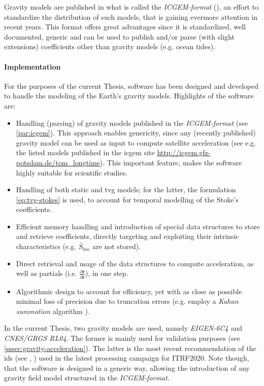 Gravity models are published in what is called the \emph{ICGEM-format} 
(\cite{ICGEMFormat}), an effort to standardize the distribution of such models, 
that is gaining evermore attention in recent years. This format offers great 
advantages since it is standardized, well documented, generic and can be used to 
publish and/or parse (with slight extensions) coefficients other than gravity 
models (e.g. ocean tides).

\paragraph{Implementation}\label{par:implementation}
For the purposes of the current Thesis, software has been designed and developed 
to handle the modeling of the Earth's gravity models. Highlights of the software 
are:
\begin{itemize}
  \item Handling (parsing) of gravity models published in the \emph{ICGEM-format} 
    (see \autoref{par:icgem}). This approach enables genericity, since any (recently 
    published) gravity model can be used as input to compute satellite acceleration 
    (see e.g. the listed models published in the \gls{icgem} site \url{http://icgem.gfz-potsdam.de/tom_longtime}).
    This important feature, makes the software highly suitable for scientific studies.
  \item Handling of both static and \gls{tvg} models; for the latter, the formulation 
    \autoref{eq:tvg-stokes} is used, to account for temporal modelling of the 
    Stoke's coefficients.
  \item Efficient memory handling and introduction of special data structures to 
    store and retrieve coefficients, directly targeting and exploiting their intrinsic
    characteristics (e.g. $\bar{S}_{0m}$ are not stored).
  \item Direct retrieval and usage of the data structures to compute acceleration, 
    as well as partials (i.e. $\frac{\partial \bm{\ddot{r}}}{\partial \bm{r}}$), 
    in one step.
  \item Algorithmic design to account for efficiency, yet with as close as possible 
    minimal loss of precision due to truncation errors (e.g. employ a 
    \emph{Kahan summation} algorithm \cite{Klein2006}).
\end{itemize}

In the current Thesis, two gravity models are used, namely \emph{EIGEN-6C4} 
\cite{Forste2014} and \emph{CNES/GRGS RL04}. The former is mainly used for validation 
purposes (see \autoref{sssec:gravity-acceleration}). The latter is the most 
recent recommendation of the \gls{ids} (see \cite{Lemoine2019b}, \cite{Stepanek2022a}) 
used in the latest processing campaign for ITRF2020. Note though, that the software 
is designed in a generic way, allowing the introduction of any gravity field model 
structured in the \emph{ICGEM-format}.

